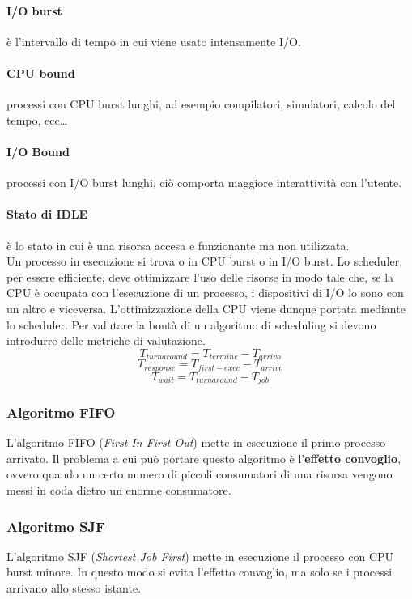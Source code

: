 \documentclass[12pt, letterpaper]{article}
\begin{document}
			\paragraph{I/O burst} è l'intervallo di tempo in cui viene usato intensamente I/O.
			\paragraph{CPU bound} processi con CPU burst lunghi, ad esempio compilatori, simulatori, calcolo del tempo, ecc\dots
			\paragraph{I/O Bound} processi con I/O burst lunghi, ciò comporta maggiore interattività con l'utente.
			\paragraph{Stato di IDLE} è lo stato in cui è una risorsa accesa e funzionante ma non utilizzata. \\	
							
			Un processo in esecuzione si trova o in CPU burst o in I/O burst. 			
			Lo scheduler, per essere efficiente, deve ottimizzare l'uso delle risorse in modo tale che, se la CPU è occupata con l'esecuzione di un processo, i dispositivi di I/O lo sono con un altro e viceversa. L'ottimizzazione della CPU viene dunque portata mediante lo scheduler. Per valutare la bontà di un algoritmo di scheduling si devono introdurre delle metriche di valutazione.
			$$T_{turnaround} = T_{termine} - T_{arrivo}$$
			$$T_{response} = T_{first-exec} - T_{arrivo}$$
			$$T_{wait} = T_{turnaround} - T_{job}$$
				
			\subsubsection{Algoritmo FIFO} 
				L'algoritmo FIFO (\textit{First In First Out}) mette in esecuzione il primo processo arrivato. Il problema a cui può portare questo algoritmo è l'\textbf{effetto convoglio}, ovvero quando un certo numero di piccoli consumatori di una risorsa vengono messi in coda dietro un enorme consumatore. 
				
			\subsubsection{Algoritmo SJF}
				L'algoritmo SJF (\textit{Shortest Job First}) mette in esecuzione il processo con CPU burst minore. In questo modo si evita l'effetto convoglio, ma solo se i processi arrivano allo stesso istante.
					
\end{document}
